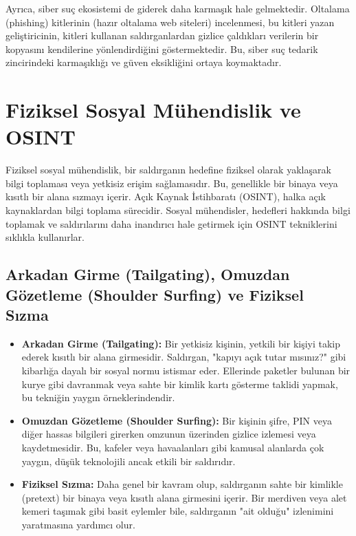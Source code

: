 Ayrıca, siber suç ekosistemi de giderek daha karmaşık hale gelmektedir. Oltalama (phishing) kitlerinin (hazır oltalama web siteleri) incelenmesi, bu kitleri yazan geliştiricinin, kitleri kullanan saldırganlardan gizlice çaldıkları verilerin bir kopyasını kendilerine yönlendirdiğini göstermektedir. Bu, siber suç tedarik zincirindeki karmaşıklığı ve güven eksikliğini ortaya koymaktadır.

\section{Fiziksel Sosyal Mühendislik ve OSINT}

Fiziksel sosyal mühendislik, bir saldırganın hedefine fiziksel olarak yaklaşarak bilgi toplaması veya yetkisiz erişim sağlamasıdır. Bu, genellikle bir binaya veya kısıtlı bir alana sızmayı içerir. Açık Kaynak İstihbaratı (OSINT), halka açık kaynaklardan bilgi toplama sürecidir. Sosyal mühendisler, hedefleri hakkında bilgi toplamak ve saldırılarını daha inandırıcı hale getirmek için OSINT tekniklerini sıklıkla kullanırlar.

\subsection{Arkadan Girme (Tailgating), Omuzdan Gözetleme (Shoulder Surfing) ve Fiziksel Sızma}

\begin{itemize}
    \item \textbf{Arkadan Girme (Tailgating):} Bir yetkisiz kişinin, yetkili bir kişiyi takip ederek kısıtlı bir alana girmesidir. Saldırgan, "kapıyı açık tutar mısınız?" gibi kibarlığa dayalı bir sosyal normu istismar eder. Ellerinde paketler bulunan bir kurye gibi davranmak veya sahte bir kimlik kartı gösterme taklidi yapmak, bu tekniğin yaygın örneklerindendir.
    \item \textbf{Omuzdan Gözetleme (Shoulder Surfing):} Bir kişinin şifre, PIN veya diğer hassas bilgileri girerken omzunun üzerinden gizlice izlemesi veya kaydetmesidir. Bu, kafeler veya havaalanları gibi kamusal alanlarda çok yaygın, düşük teknolojili ancak etkili bir saldırıdır.
    \item \textbf{Fiziksel Sızma:} Daha genel bir kavram olup, saldırganın sahte bir kimlikle (pretext) bir binaya veya kısıtlı alana girmesini içerir. Bir merdiven veya alet kemeri taşımak gibi basit eylemler bile, saldırganın "ait olduğu" izlenimini yaratmasına yardımcı olur.
\end{itemize}

